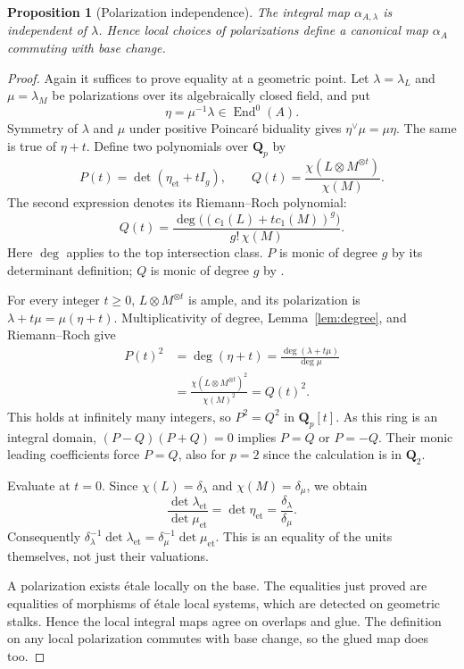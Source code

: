 \documentclass[11pt]{article}
\newtheorem{proposition}[theorem]{Proposition}
\theoremstyle{definition}\newtheorem{definition}[theorem]{Definition}
\theoremstyle{remark}\newtheorem{remark}[theorem]{Remark}
\newcommand{\QQ}{\mathbf Q}
\newcommand{\et}{\mathrm{et}}
\newcommand{\End}{\operatorname{End}}
\begin{document}
\begin{proposition}[Polarization independence]\label{prop:independence}
The integral map $\alpha_{A,\lambda}$ is independent of $\lambda$. Hence local choices of polarizations define a canonical map $\alpha_A$ commuting with base change.
\end{proposition}
\begin{proof}
Again it suffices to prove equality at a geometric point. Let $\lambda=\lambda_L$ and $\mu=\lambda_M$ be polarizations over its algebraically closed field, and put
\[
 \eta=\mu^{-1}\lambda\in\End^0(A).
\]
Symmetry of $\lambda$ and $\mu$ under positive Poincar\'e biduality gives $\eta^\vee\mu=\mu\eta$. The same is true of $\eta+t$. Define two polynomials over $\QQ_p$ by
\[
 P(t)=\det(\eta_{\et}+tI_g),\qquad
 Q(t)=\frac{\chi(L\otimes M^{\otimes t})}{\chi(M)}.
\]
The second expression denotes its Riemann--Roch polynomial:
\[
 Q(t)=\frac{\deg\bigl((c_1(L)+t c_1(M))^g\bigr)}{g!\,\chi(M)}.
\]
Here $\deg$ applies to the top intersection class. $P$ is monic of degree $g$ by its determinant definition; $Q$ is monic of degree $g$ by \citet[Theorem~9.11, pp.~131--133]{EGM}.

For every integer $t\ge0$, $L\otimes M^{\otimes t}$ is ample, and its polarization is $\lambda+t\mu=\mu(\eta+t)$. Multiplicativity of degree, Lemma~\ref{lem:degree}, and Riemann--Roch give
\begin{align*}
 P(t)^2
 &=\deg(\eta+t)
 =\frac{\deg(\lambda+t\mu)}{\deg\mu}\\
 &=\frac{\chi(L\otimes M^{\otimes t})^2}{\chi(M)^2}
 =Q(t)^2.
\end{align*}
This holds at infinitely many integers, so $P^2=Q^2$ in $\QQ_p[t]$. As this ring is an integral domain, $(P-Q)(P+Q)=0$ implies $P=Q$ or $P=-Q$. Their monic leading coefficients force $P=Q$, also for $p=2$ since the calculation is in $\QQ_2$.

Evaluate at $t=0$. Since $\chi(L)=\delta_\lambda$ and $\chi(M)=\delta_\mu$, we obtain
\[
 \frac{\det\lambda_{\et}}{\det\mu_{\et}}
 =\det\eta_{\et}
 =\frac{\delta_\lambda}{\delta_\mu}.
\]
Consequently $\delta_\lambda^{-1}\det\lambda_{\et}
=\delta_\mu^{-1}\det\mu_{\et}$. This is an equality of the units themselves, not just their valuations.

A polarization exists \'etale locally on the base. The equalities just proved are equalities of morphisms of \'etale local systems, which are detected on geometric stalks. Hence the local integral maps agree on overlaps and glue. The definition on any local polarization commutes with base change, so the glued map does too.
\end{proof}
\end{document}
